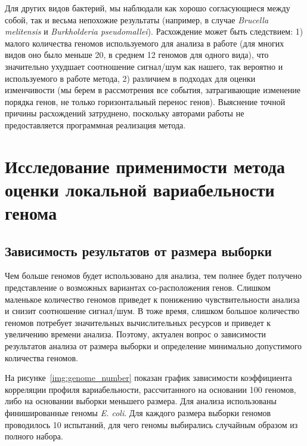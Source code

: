 Для других видов бактерий, мы наблюдали как хорошо согласующиеся между собой, так и весьма непохожие результаты (например, в случае \textit{Brucella melitensis} и \textit{Burkholderia pseudomallei}). Расхождение может быть следствием: 1) малого количества геномов используемого для анализа в работе \cite{oliveira2017chromosomal} (для многих видов оно было меньше 20, в среднем 12 геномов для одного вида), что значительно ухудшает соотношение сигнал/шум как нашего, так вероятно и используемого в работе \cite{oliveira2017chromosomal} метода, 2) различием в подходах для оценки изменчивости (мы берем в рассмотрения все события, затрагивающие изменение порядка генов, не только горизонтальный перенос генов). Выяснение точной причины расхождений затруднено, поскольку авторами работы \cite{oliveira2017chromosomal} не предоставляется программная реализация метода.

\section{Исследование применимости метода оценки локальной вариабельности генома}

\subsection{Зависимость результатов от размера выборки}

Чем больше геномов будет использовано для анализа, тем полнее будет получено представление о возможных вариантах со-расположения генов. Слишком маленькое количество геномов приведет к понижению чувствительности анализа и снизит соотношение сигнал/шум. В тоже время, слишком большое количество геномов потребует значительных вычислительных ресурсов и приведет к увеличению времени анализа. Поэтому, актуален вопрос о зависимости результатов анализа от размера выборки и определение минимально допустимого количества геномов.

На рисунке~\ref{img:genome_number} показан график зависимости коэффициента корреляции профиля вариабельности, рассчитанного на основании 100 геномов, либо на основании выборки меньшего размера. Для анализа использованы финишированные геномы \textit{E. coli}. Для каждого размера выборки геномов проводилось 10 испытаний, для чего геномы выбирались случайным образом из полного набора. 

